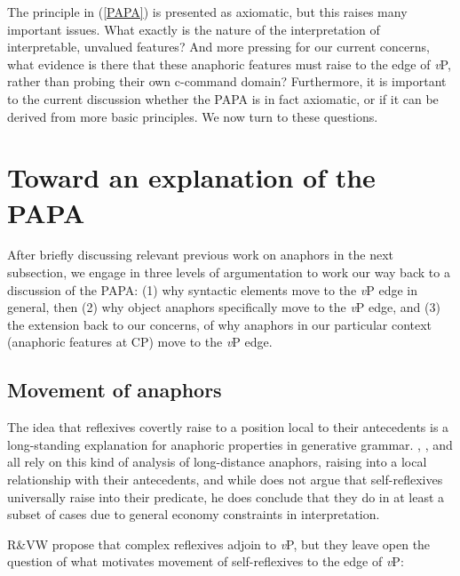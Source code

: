 \documentclass[output=paper
,modfonts
,nonflat
]{langsci/langscibook}
\begin{document}
The principle in (\ref{PAPA}) is presented as axiomatic, but this raises many important issues. What exactly is the nature of the interpretation of interpretable, unvalued features? And more pressing for our current concerns, what evidence is there that these anaphoric features must raise to the edge of \textit{v}P, rather than probing their own c-command domain? Furthermore, it is important to the current discussion whether the PAPA is in fact axiomatic, or if it can be derived from more basic principles. We now turn to these questions.

\section{Toward an explanation of the PAPA} \label{ExplainPAPA}

After briefly discussing relevant previous work on anaphors in the next subsection, we engage in three levels of argumentation to work our way back to a discussion of the PAPA: (1) why syntactic elements move to the \textit{v}P edge in general, then (2) why object anaphors specifically move to the \textit{v}P edge, and (3) the extension back to our concerns, of why anaphors in our particular context (anaphoric features at CP) move to the \textit{v}P edge. 

\subsection{Movement of anaphors}
The idea that reflexives covertly raise to a position local to their antecedents is a long-standing explanation for anaphoric properties in generative grammar. \citet{Safir:2004}, \citet{Pica:1987}, and \citet{Cole:1990} all rely on this kind of analysis of long-distance anaphors, raising into a local relationship with their antecedents, and while \citet{Reuland:2011} does not argue that self-reflexives universally raise into their predicate, he does conclude that they do in at least a subset of cases due to general economy constraints in interpretation. 

R\&VW propose that complex reflexives adjoin to \textit{v}P, but they leave open the question of what motivates movement of self-reflexives to the edge of \textit{v}P: 
\end{document}
